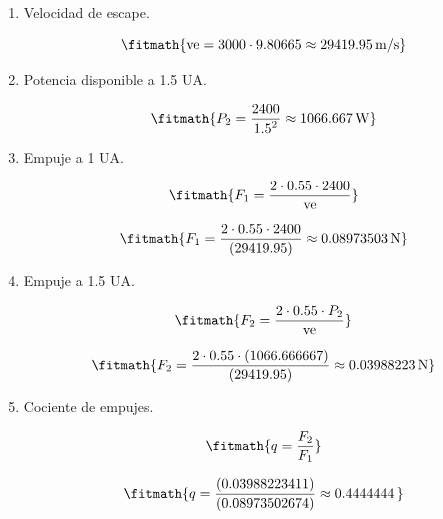 \begin{enumerate}

\item Velocidad de escape.

\[\fitmath{\mathrm{ve}=3000\cdot 9.80665\approx 29419.95\,\mathrm{m/s}}\]

\item Potencia disponible a 1.5 UA.

\[\fitmath{P_{2}=\frac{2400}{{1.5}^{2}}\approx 1066.667\,\mathrm{W}}\]

\item Empuje a 1 UA.

\[\fitmath{F_{1}=\frac{2\cdot 0.55\cdot 2400}{\mathrm{ve}}}\]

\[\fitmath{F_{1}=\frac{2\cdot 0.55\cdot 2400}{(29419.95)}\approx 0.08973503\,\mathrm{N}}\]

\item Empuje a 1.5 UA.

\[\fitmath{F_{2}=\frac{2\cdot 0.55\cdot P_{2}}{\mathrm{ve}}}\]

\[\fitmath{F_{2}=\frac{2\cdot 0.55\cdot (1066.666667)}{(29419.95)}\approx 0.03988223\,\mathrm{N}}\]

\item Cociente de empujes.

\[\fitmath{q=\frac{F_{2}}{F_{1}}}\]

\[\fitmath{q=\frac{(0.03988223411)}{(0.08973502674)}\approx 0.4444444\,}\]

\end{enumerate}
